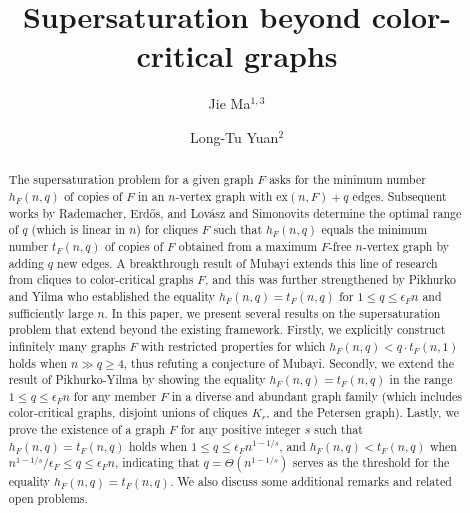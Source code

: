 \documentclass[10pt]{article}
\def\ex{\mathrm{ex}}
\begin{document}
\title{Supersaturation beyond color-critical graphs}
\author{
Jie Ma$^{1,3}$\and
\and
Long-Tu Yuan$^2$
}
\date{}
\maketitle


\begin{abstract}
The supersaturation problem for a given graph $F$ asks for the minimum number $h_F(n,q)$ of copies of $F$ in an $n$-vertex graph with $\ex(n,F)+q$ edges.
Subsequent works by Rademacher, Erd\H{o}s, and Lov\'{a}sz and Simonovits determine the optimal range of $q$ (which is linear in $n$) for cliques $F$ such that
$h_F(n,q)$ equals the minimum number $t_F(n,q)$ of copies of $F$ obtained from a maximum $F$-free $n$-vertex graph by adding $q$ new edges.
A breakthrough result of Mubayi extends this line of research from cliques to color-critical graphs $F$,
and this was further strengthened by Pikhurko and Yilma who established the equality $h_F(n,q)=t_F(n,q)$ for $1\leq q\leq \epsilon_F n$ and sufficiently large $n$.
In this paper, we present several results on the supersaturation problem that extend beyond the existing framework.
Firstly, we explicitly construct infinitely many graphs $F$ with restricted properties for which $h_F(n,q)<q\cdot t_F(n,1)$ holds when $n\gg q\geq 4$, thus refuting a conjecture of Mubayi.
Secondly, we extend the result of Pikhurko-Yilma by showing the equality $h_F(n,q)=t_F(n,q)$ in the range $1\leq q\leq \epsilon_F n$ for any member $F$ in a diverse and abundant graph family (which includes color-critical graphs, disjoint unions of cliques $K_r$, and the Petersen graph).
Lastly, we prove the existence of a graph $F$ for any positive integer $s$ such that $h_F(n,q)=t_F(n,q)$ holds when $1\leq q\leq \epsilon_F n^{1-1/s}$, and $h_F(n,q)<t_F(n,q)$ when $n^{1-1/s}/\epsilon_F\leq q\leq \epsilon_F n$,
indicating that $q=\Theta(n^{1-1/s})$ serves as the threshold for the equality $h_F(n,q)=t_F(n,q)$.
We also discuss some additional remarks and related open problems.
\end{abstract}
\end{document}
